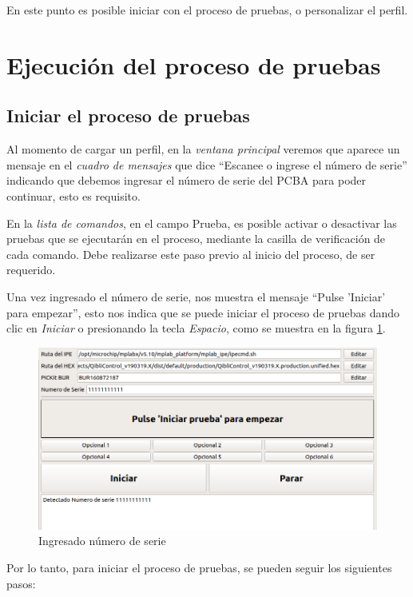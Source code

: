 \documentclass[a4paper,12pt]{refart}
\newcommand\commandList{\textit{lista de comandos}}
\begin{document}
En este punto es posible iniciar con el proceso de pruebas, o personalizar el perfil.

\newpage

\section{Ejecución del proceso de pruebas}
\subsection{Iniciar el proceso de pruebas}
Al momento de cargar un perfil, en la \textit{ventana principal} veremos que aparece un mensaje en el \textit{cuadro de mensajes} que dice ``Escanee o ingrese el número de serie'' indicando que debemos ingresar el número de serie del PCBA para poder continuar, esto es requisito.

En la \commandList{}, en el campo Prueba, es posible activar o desactivar las pruebas que se ejecutarán en el proceso, mediante la casilla de verificación de cada comando. Debe realizarse este paso previo al inicio del proceso, de ser requerido.

Una vez ingresado el número de serie, nos muestra el mensaje ``Pulse 'Iniciar' para empezar'', esto nos indica que se puede iniciar el proceso de pruebas dando clic en \textit{Iniciar} o presionando la tecla \textit{Espacio}, como se muestra en la figura \ref{fig:snReaded}.

\begin{figure}[hbt!]\centering
\includegraphics[width=\textwidth, frame]{images/serial_number_readed} 
\caption{Ingresado número de serie}
\label{fig:snReaded}
\end{figure}

Por lo tanto, para iniciar el proceso de pruebas, se pueden seguir los siguientes pasos:
\end{document}
